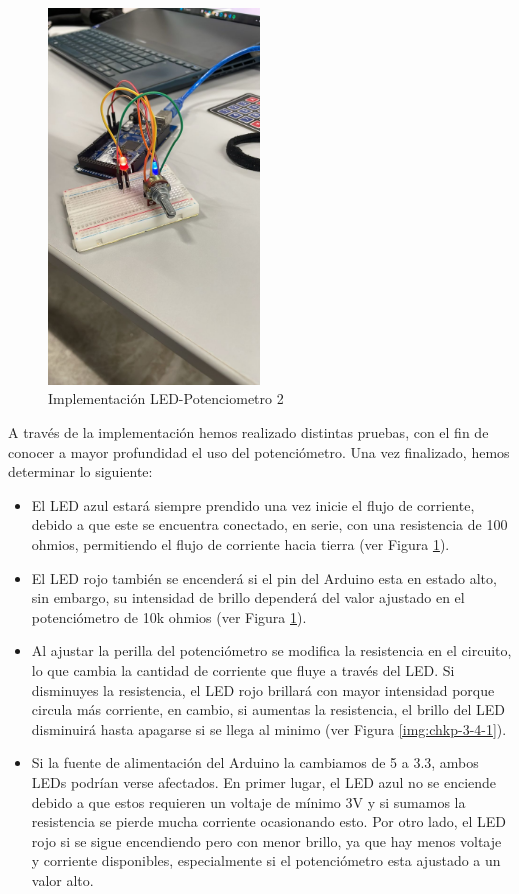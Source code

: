 \documentclass{article}
\begin{document}
\begin{figure}[H]
    \centering
    \includegraphics[width=0.50\textwidth]{./img/chkp-3-4-2.jpeg}
    \caption{Implementación LED-Potenciometro 2}
    \label{img:chkp-3-4-2}
\end{figure}

A través de la implementación hemos realizado distintas pruebas, con el fin de conocer a mayor profundidad el uso del potenciómetro. Una vez finalizado, hemos determinar lo siguiente:
\begin{itemize}
    \item El LED azul estará siempre prendido una vez inicie el flujo de corriente, debido a que este se encuentra conectado, en serie, con una resistencia de 100 ohmios, permitiendo el flujo de corriente hacia tierra (ver Figura \ref{img:chkp-3-4-2}).
    \item El LED rojo también se encenderá si el pin del Arduino esta en estado alto, sin embargo, su intensidad de brillo dependerá del valor ajustado en el potenciómetro de 10k ohmios (ver Figura \ref{img:chkp-3-4-2}).
    \item Al ajustar la perilla del potenciómetro se modifica la resistencia en el circuito, lo que cambia la cantidad de corriente que fluye a través del LED. Si disminuyes la resistencia, el LED rojo brillará con mayor intensidad porque circula más corriente, en cambio, si aumentas la resistencia, el brillo del LED disminuirá hasta apagarse si se llega al minimo (ver Figura \ref{img:chkp-3-4-1}).
    \item Si la fuente de alimentación del Arduino la cambiamos de 5 a 3.3, ambos LEDs podrían verse afectados. En primer lugar, el LED azul no se enciende debido a que estos requieren un voltaje de mínimo 3V y si sumamos la resistencia se pierde mucha corriente ocasionando esto. Por otro lado, el LED rojo si se sigue encendiendo pero con menor brillo, ya que hay menos voltaje y corriente disponibles, especialmente si el potenciómetro esta ajustado a un valor alto.
\end{itemize}
\end{document}
